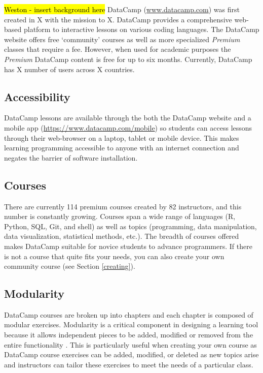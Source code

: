 \documentclass{tise_style_doi}
\begin{document}
\hl{Weston - insert background here}
DataCamp (\url{www.datacamp.com}) was first created in X with the mission to X.
DataCamp provides a comprehensive web-based platform to interactive lessons on various coding
languages. The DataCamp website offers free `community' courses
as well as more specialized \textit{Premium} classes that require a fee. However, when used
for academic purposes the \textit{Premium} DataCamp content is free for up to six months.
Currently, DataCamp has X number of users across X countries.

\subsection{Accessibility}

DataCamp lessons are available through the both the DataCamp website and a mobile app
(\url{https://www.datacamp.com/mobile}) so students can access lessons through their
web-browser on a laptop, tablet or mobile device.  This makes learning programming
accessible to anyone with an internet connection and negates the barrier of software installation.

\subsection{Courses}

There are currently 114 premium courses created by 82 instructors, and this
number is constantly growing.  Courses span a wide range of languages (R, Python, SQL,
Git, and shell) as well as topics (programming, data manipulation, data visualization,
statistical methods, etc.).  The breadth of courses offered makes DataCamp suitable
for novice students to advance programmers. If there is not a course that quite
fits your needs, you can also create your own community course (see Section \ref{creating}).

\subsection{Modularity}

DataCamp courses are broken up into chapters and each chapter is composed of modular
exercises. Modularity is a critical component in designing a learning tool because it
allows independent pieces to be added, modified or removed from the entire functionality
\citep{Hare2017}. This is particularly useful when creating your own course as DataCamp
course exercises can be added, modified, or deleted as new topics arise and instructors
can tailor these exercises to meet the needs of a particular class. 
\end{document}
